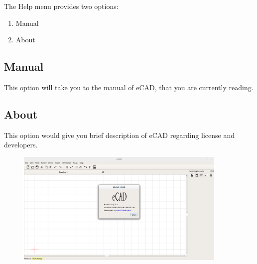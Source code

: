The Help menu provides two options:
\begin{enumerate}
\item Manual
\item About
\end{enumerate}
\subsection{Manual}
This option will take you to the manual of eCAD, that you are currently reading.
\subsection{About}
This option would give you brief description of eCAD regarding license and developers.
\begin{figure}[h!]
\centering
\includegraphics[width=0.9\textwidth]{images/help.png}
\end{figure}